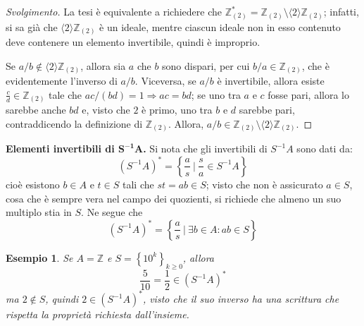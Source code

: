 \documentclass[12pt]{scrartcl}
\theoremstyle{style}
\newtheorem{esempio}{Esempio}[section]
\newenvironment{svolgimento}{\renewcommand\qedsymbol{$\blacksquare$}\begin{proof}[Svolgimento]}{\end{proof}}
\numberwithin{equation}{subsection}
\begin{document}
	\begin{svolgimento}
		La tesi \`e equivalente a richiedere che $\mathbb{Z}_{(2)} ^* = \mathbb{Z}_{(2)} \setminus\langle 2 \rangle\mathbb{Z}_{(2)} $; infatti, si sa gi\`a che $\langle 2 \rangle\mathbb{Z}_{(2)} $ \`e un ideale, mentre ciascun ideale non in esso contenuto deve contenere un elemento invertibile, quindi \`e improprio.

		Se $a / b \not \in \langle 2 \rangle\mathbb{Z}_{(2)} $, allora sia $a$ che $b$ sono dispari, per cui $b/a \in \mathbb{Z}_{(2)} $, che \`e evidentemente l'inverso di $a / b$.
		Viceversa, se $a / b$ \`e invertibile, allora esiste $ \frac{c}{ d} \in \mathbb{Z}_(2)$ tale che $ac / (bd) =1 \Rightarrow ac = bd$; se uno tra $a$ e $c$ fosse pari, allora lo sarebbe anche $bd$ e, visto che $2$ \`e primo, uno tra $b$ e $d$ sarebbe pari, contraddicendo la definizione di $\mathbb{Z}_{(2)} $.
		Allora, $a / b \in \mathbb{Z}_{(2)} \setminus \langle 2 \rangle\mathbb{Z}_{(2)} $.
	\end{svolgimento}

\textbf{Elementi invertibili di $\mathbf{S^{-1}A} $.} 
Si nota che gli invertibili di $S^{-1}A$ sono dati da:
\[
	(S^{-1}A)^* = \left\{ \frac{a}{s} \ \bigg\lvert \ \frac{s}{a} \in S^{-1}A \right\} 
\] 
cio\`e esistono $b \in A$ e $t \in S$ tali che $st =  ab \in S$; visto che non \`e assicurato $a \in S$, cosa che \`e sempre vera nel campo dei quozienti, si richiede che almeno un suo multiplo stia in $S$.
Ne segue che 
\[
	(S^{-1}A) ^* = \left\{ \frac{a}{s} \ \bigg\lvert \ \exists b \in A : ab \in S \right\} 
\] 
\begin{esempio}
Se $A = \mathbb{Z}$ e $S = \left\{ 10^k \right\} _{k\ge 0} $, allora 
\[
\frac{5}{10}= \frac{1}{2}\in (S^{-1}A)^*
\] 
ma $2 \not \in S$, quindi $2 \in (S^{-1}A)^*$, visto che il suo inverso ha una scrittura che rispetta la propriet\`a richiesta dall'insieme.
\end{esempio}
\end{document}
